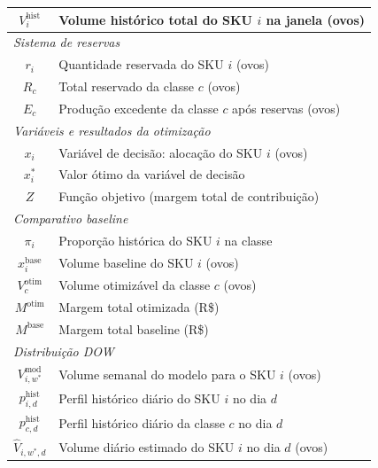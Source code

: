 \documentclass[11pt,a4paper]{article}
\begin{document}
\begin{longtable}{cl}
$V_i^{\text{hist}}$ & Volume histórico total do SKU $i$ na janela (ovos) \\
\midrule
\multicolumn{2}{l}{\textit{Sistema de reservas}} \\[4pt]
$r_i$ & Quantidade reservada do SKU $i$ (ovos) \\
$R_c$ & Total reservado da classe $c$ (ovos) \\
$E_c$ & Produção excedente da classe $c$ após reservas (ovos) \\
\midrule
\multicolumn{2}{l}{\textit{Variáveis e resultados da otimização}} \\[4pt]
$x_i$ & Variável de decisão: alocação do SKU $i$ (ovos) \\
$x_i^*$ & Valor ótimo da variável de decisão \\
$Z$ & Função objetivo (margem total de contribuição) \\
\midrule
\multicolumn{2}{l}{\textit{Comparativo baseline}} \\[4pt]
$\pi_i$ & Proporção histórica do SKU $i$ na classe \\
$x_i^{\text{base}}$ & Volume baseline do SKU $i$ (ovos) \\
$V_c^{\text{otim}}$ & Volume otimizável da classe $c$ (ovos) \\
$M^{\text{otim}}$ & Margem total otimizada (R\$) \\
$M^{\text{base}}$ & Margem total baseline (R\$) \\
\midrule
\multicolumn{2}{l}{\textit{Distribuição DOW}} \\[4pt]
$V^{\text{mod}}_{i,w^*}$ & Volume semanal do modelo para o SKU $i$ (ovos) \\
$p^{\text{hist}}_{i,d}$ & Perfil histórico diário do SKU $i$ no dia $d$ \\
$p^{\text{hist}}_{c,d}$ & Perfil histórico diário da classe $c$ no dia $d$ \\
$\hat{V}_{i,w^*,d}$ & Volume diário estimado do SKU $i$ no dia $d$ (ovos) \\
\bottomrule
\end{longtable}
\end{document}
